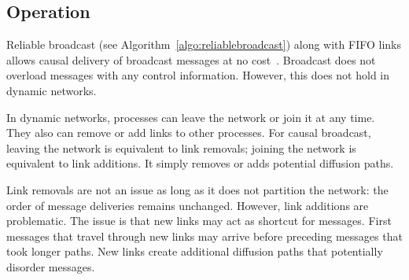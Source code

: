 %     



\subsection{Operation}

Reliable broadcast (see Algorithm~\ref{algo:reliablebroadcast}) along with FIFO
links allows causal delivery of broadcast messages at no
cost~\cite{friedman2004causal}. Broadcast does not overload messages with any
control information. However, this does not hold in dynamic networks.

In dynamic networks, processes can leave the network or join it at any time.
They also can remove or add links to other processes. For causal broadcast,
leaving the network is equivalent to link removals; joining the network is
equivalent to link additions. It simply removes or adds potential diffusion
paths.

Link removals are not an issue as long as it does not partition the network: the
order of message deliveries remains unchanged. However, link additions are
problematic.  The issue is that new links may act as shortcut for
messages. First messages that travel through new links may arrive before
preceding messages that took longer paths. New links create additional diffusion
paths that potentially disorder messages. 

